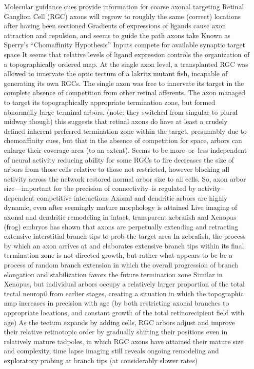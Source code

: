 \documentclass[11pt, a4paper, oneside]{article}   	%
\begin{document}
\begin{outline}
 \point Molecular guidance cues provide information for coarse axonal targeting 
    \subpoint Retinal Ganglion Cell (RGC) axons will regrow to roughly the same (correct) locations after having been sectioned
    \subpoint Gradients of expressions of ligands cause axon attraction and repulsion, and seems to guide the path axons take
        \subsubpoint Known as Sperry's ``Chomaffinity Hypothesis''
 \point Inputs compete for available synaptic target space
    \subpoint It seems that relative levels of ligand expression controls the organization of a topographically ordered map.
    \subpoint At the single axon level, a transplanted RGC was allowed to innervate the optic tectum of a lakritz mutant fish, incapable of generating its own RGCs. The single axon was free to innervate its target in the complete absence of competition from other retinal afferents. The axon managed to target its topographically appropriate termination zone, but formed abnormally large terminal arbors. (note: they switched from singular to plural midway though)
        \subsubpoint this suggests that retinal axons do have at least a crudely defined inherent preferred termination zone within the target, presumably due to chemoaffinity cues, but that in the absence of competition for space, arbors can enlarge their coverage area (to an extent).
    \subpoint Seems to be more--or--less independent of neural activity 
        \subsubpoint reducing ability for some RGCs to fire decreases the size of arbors from those cells relative to those not restricted, however blocking all activity across the network restored normal arbor size to all cells.
            \supersubpoint So, axon arbor size---important for the precision of connectivity--is regulated by activity--dependent competitive interactions
 \point Axonal and dendritic arbors are highly dynamic, even after seemingly mature morphology is attained
    \subpoint Live imaging of axonal and dendritic remodeling in intact, transparent zebrafish and Xenopus (frog) embryos has shown that axons are perpetually extending and retracting extensive interstitial branch tips to prob the target area
    \subpoint In zebrafish, the process by which an axon arrives at and elaborates extensive branch tips within its final termination zone is not directed growth, but rather what appears to be be a process of random branch extension in which the overall progression of branch elongation and stabilization favors the future termination zone
    \subpoint Similar in Xenopus, but individual arbors occupy a relatively larger proportion of the total tectal neuropil from earlier stages, creating a situation in which the topographic map increases in precision with age (by both restricting axonal branches to appropriate locations, and constant growth of the total retinorecipient field with age)
    \subpoint As the tectum expands by adding cells, RGC arbors adjust and improve their relative retinotopic order by gradually shifting their positions
    \subpoint even in relatively mature tadpoles, in which RGC axons have attained their mature size and complexity, time lapse imaging still reveals ongoing remodeling and exploratory probing at branch tips (at considerably slower rates)



\end{outline}
\end{document}
